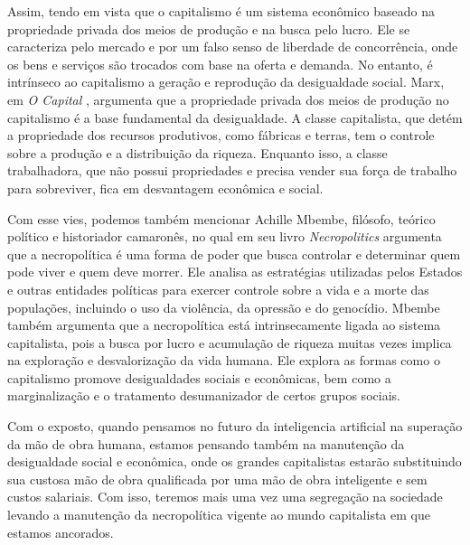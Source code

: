 \par
Assim, tendo em vista que o capitalismo é um sistema econômico baseado na propriedade privada dos meios de produção e na busca pelo lucro. Ele se caracteriza pelo mercado e por um falso senso de liberdade de concorrência, onde os bens e serviços são trocados com base na oferta e demanda. No entanto, é intrínseco ao capitalismo a geração e reprodução da desigualdade social. Marx, em \textit{O Capital} \cite{marx2016capital}, argumenta que a propriedade privada dos meios de produção no capitalismo é a base fundamental da desigualdade. A classe capitalista, que detém a propriedade dos recursos produtivos, como fábricas e terras, tem o controle sobre a produção e a distribuição da riqueza. Enquanto isso, a classe trabalhadora, que não possui propriedades e precisa vender sua força de trabalho para sobreviver, fica em desvantagem econômica e social.
\par
Com esse vies, podemos também mencionar Achille Mbembe, filósofo, teórico político e historiador camaronês, no qual em seu livro \textit{Necropolitics} \cite{mbembe2006necropolitics} argumenta que a necropolítica é uma forma de poder que busca controlar e determinar quem pode viver e quem deve morrer. Ele analisa as estratégias utilizadas pelos Estados e outras entidades políticas para exercer controle sobre a vida e a morte das populações, incluindo o uso da violência, da opressão e do genocídio. Mbembe também argumenta que a necropolítica está intrinsecamente ligada ao sistema capitalista, pois a busca por lucro e acumulação de riqueza muitas vezes implica na exploração e desvalorização da vida humana. Ele explora as formas como o capitalismo promove desigualdades sociais e econômicas, bem como a marginalização e o tratamento desumanizador de certos grupos sociais.
\par
Com o exposto, quando pensamos no futuro da inteligencia artificial na superação da mão de obra humana, estamos pensando também na manutenção da desigualdade social e econômica, onde os grandes capitalistas estarão substituindo sua custosa mão de obra qualificada por uma mão de obra inteligente e sem custos salariais. Com isso, teremos mais uma vez uma segregação na sociedade levando a manutenção da necropolítica vigente ao mundo capitalista em que estamos ancorados.
